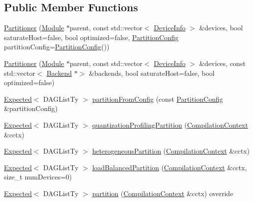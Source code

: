 \subsection*{Public Member Functions}
\begin{DoxyCompactItemize}
\item 
\hyperlink{classglow_1_1_partitioner_a96c68cbdf64decc46911e4a4a67e432b}{Partitioner} (\hyperlink{classglow_1_1_module}{Module} $\ast$parent, const std\+::vector$<$ \hyperlink{structglow_1_1runtime_1_1_device_info}{Device\+Info} $>$ \&devices, bool saturate\+Host=false, bool optimized=false, \hyperlink{structglow_1_1runtime_1_1_partition_config}{Partition\+Config} partition\+Config=\hyperlink{structglow_1_1runtime_1_1_partition_config}{Partition\+Config}())
\item 
\hyperlink{classglow_1_1_partitioner_a7de345d695b595b2ade385ee1cd82644}{Partitioner} (\hyperlink{classglow_1_1_module}{Module} $\ast$parent, const std\+::vector$<$ \hyperlink{structglow_1_1runtime_1_1_device_info}{Device\+Info} $>$ \&devices, const std\+::vector$<$ \hyperlink{classglow_1_1_backend}{Backend} $\ast$$>$ \&backends, bool saturate\+Host=false, bool optimized=false)
\item 
\hyperlink{classglow_1_1detail_1_1_glow_expected}{Expected}$<$ D\+A\+G\+List\+Ty $>$ \hyperlink{classglow_1_1_partitioner_a8d9623d32a7ebfc467e2baea9eb8ae7a}{partition\+From\+Config} (const \hyperlink{structglow_1_1runtime_1_1_partition_config}{Partition\+Config} \&partition\+Config)
\item 
\hyperlink{classglow_1_1detail_1_1_glow_expected}{Expected}$<$ D\+A\+G\+List\+Ty $>$ \hyperlink{classglow_1_1_partitioner_afa9a4f53e01814f1ddd292af1fecff4a}{quantization\+Profiling\+Partition} (\hyperlink{structglow_1_1_compilation_context}{Compilation\+Context} \&cctx)
\item 
\hyperlink{classglow_1_1detail_1_1_glow_expected}{Expected}$<$ D\+A\+G\+List\+Ty $>$ \hyperlink{classglow_1_1_partitioner_adb733cf9c471edeb7cac89224c403368}{heterogeneous\+Partition} (\hyperlink{structglow_1_1_compilation_context}{Compilation\+Context} \&cctx)
\item 
\hyperlink{classglow_1_1detail_1_1_glow_expected}{Expected}$<$ D\+A\+G\+List\+Ty $>$ \hyperlink{classglow_1_1_partitioner_aa1f821ee76481495e079c7fd9325b357}{load\+Balanced\+Partition} (\hyperlink{structglow_1_1_compilation_context}{Compilation\+Context} \&cctx, size\+\_\+t num\+Devices=0)
\item 
\hyperlink{classglow_1_1detail_1_1_glow_expected}{Expected}$<$ D\+A\+G\+List\+Ty $>$ \hyperlink{classglow_1_1_partitioner_a41d81aa72c7c6105def11a06097166fb}{partition} (\hyperlink{structglow_1_1_compilation_context}{Compilation\+Context} \&cctx) override
\end{DoxyCompactItemize}
